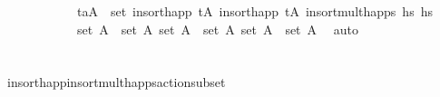 \begin{isabellebody}
\ \ \ \ \ \ \ \ \ \ \ \ {\isacartoucheopen}{\isacharparenleft}{\kern0pt}t\isactrlsub a{\isacharcomma}{\kern0pt}A{\isacharprime}{\kern0pt}{\isacharprime}{\kern0pt}{\isacharprime}{\kern0pt}{\isacharparenright}{\kern0pt}\ {\isasymin}\ set\ {\isacharparenleft}{\kern0pt}insort{\isacharunderscore}{\kern0pt}happ\ {\isacharparenleft}{\kern0pt}tA\ {\isacharparenleft}{\kern0pt}insort{\isacharunderscore}{\kern0pt}happ\ {\isacharparenleft}{\kern0pt}tA\ {\isacharparenleft}{\kern0pt}insort{\isacharunderscore}{\kern0pt}mult{\isacharunderscore}{\kern0pt}happs\ hs\ hs\ \isanewline
\ \ \ \ \ \ \ \ \ \ \ \ {\isacartoucheopen}set\ A\ {\isasymsubseteq}\ set\ A{\isacharprime}{\kern0pt}{\isacartoucheclose}\ {\isacartoucheopen}set\ A{\isacharprime}{\kern0pt}\ {\isasymsubseteq}\ set\ A{\isacharprime}{\kern0pt}{\isacharprime}{\kern0pt}{\isacartoucheclose}\ {\isacartoucheopen}set\ A{\isacharprime}{\kern0pt}{\isacharprime}{\kern0pt}\ {\isasymsubseteq}\ set\ A{\isacharprime}{\kern0pt}{\isacharprime}{\kern0pt}{\isacharprime}{\kern0pt}{\isacartoucheclose}\ \isamarkupfalse%
\ auto\isanewline
\ \ \isamarkupfalse%
%
\endisatagproof
{\isafoldproof}%
%
\isadelimproof
\ \ \ \ \ \ \ \ \ \ \ \ \ \ \ \ \ \ \ \ \ \ \ \ \ \ \ \ \ \ \ \ \ \ \ \ \ \ \ \ \ \ \ \ \ \ \ \ \ \ \ \ \ \ \ \ \ \ \ \ \ \ \ \ \ \ \ \ \ \ \ \ \ \ \ \ \ \ \ \ \ \ \ \ \ \ \ \ \ \ \ \ \ \ \ \ \ \ \ \ \ \ \ \ \ \ \ \ \ \ \ \ \ \ \ \ \ \ \ \isanewline
%
\endisadelimproof
\ \ \isanewline
\isanewline
\ \ \isamarkupfalse%
\ insort{\isacharunderscore}{\kern0pt}happ{}{\isacharunderscore}{\kern0pt}insort{\isacharunderscore}{\kern0pt}mult{\isacharunderscore}{\kern0pt}happs{\isacharunderscore}{\kern0pt}action{\isacharunderscore}{\kern0pt}subset{\isacharcolon}{\kern0pt}\isanewline

\end{isabellebody}

